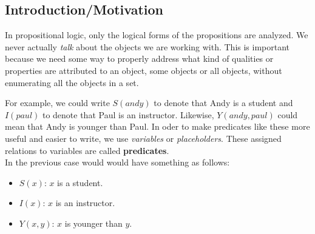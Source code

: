 \subsection{Introduction/Motivation}

In propositional logic, only the logical forms of the propositions are analyzed.  We never actually \emph{talk} about the objects we are working with.  This is important because we need some way to properly address what kind of qualities or properties are attributed to an object, some objects or all objects, without enumerating all the objects in a set.\\



For example, we could write $S(andy)$ to denote that Andy is a student and $I(paul)$ to denote that Paul is an instructor.  Likewise, $Y(andy,paul)$ could mean that Andy is younger than Paul.  In oder to make predicates like these more useful and easier to write, we use \emph{variables} or \emph{placeholders}.  These assigned relations to variables are called \textbf{predicates}.\\

In the previous case would would have something as follows:\\
\begin{itemize}
\item $S(x)$:	$x$ is a student.
\item $I(x)$:	$x$ is an instructor.
\item $Y(x,y)$:	$x$ is younger than $y$.
\end{itemize}





